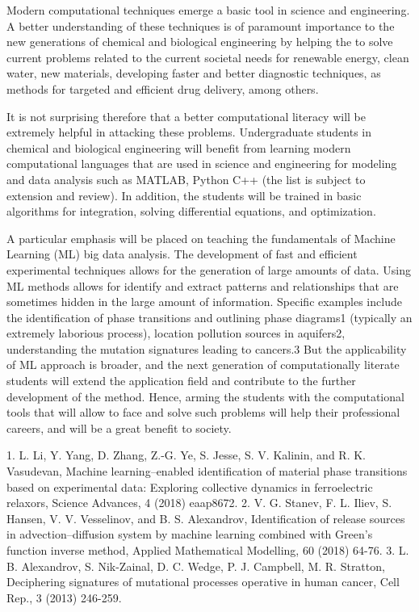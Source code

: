 Modern computational techniques emerge a basic tool in science and engineering. A better understanding of these techniques is of paramount importance to the new generations of chemical and biological engineering by helping the to solve current problems related to the current societal needs for renewable energy, clean water, new materials, developing faster and better diagnostic techniques, as methods for targeted and efficient drug delivery, among others. 

It is not surprising therefore that a better computational literacy will be extremely helpful in attacking these problems. Undergraduate students in chemical and biological engineering will benefit from learning modern computational languages that are used in science and engineering for modeling and data analysis such as MATLAB, Python C++ (the list is subject to extension and review). In addition, the students will be trained in basic algorithms for integration, solving differential equations, and optimization. 

A particular emphasis will be placed on teaching the fundamentals of Machine Learning (ML) big data analysis. The development of fast and efficient experimental techniques allows for the generation of large amounts of data. Using ML methods allows for identify and extract patterns and relationships that are sometimes hidden in the large amount of information. Specific examples include the identification of phase transitions and outlining phase diagrams1 (typically an extremely laborious process), location pollution sources in aquifers2, understanding the mutation signatures leading to cancers.3 But the applicability of ML approach is broader, and the next generation of computationally literate students will extend the application field and contribute to the further development of the method. Hence, arming the students with the computational tools that will allow to face and solve such problems will help their professional careers, and will be a great benefit to society. 

1.	L. Li, Y. Yang, D. Zhang, Z.-G. Ye, S. Jesse, S. V. Kalinin, and R. K. Vasudevan, Machine learning–enabled identification of material phase transitions based on experimental data: Exploring collective dynamics in ferroelectric relaxors, Science Advances, 4 (2018) eaap8672.
2.	V. G. Stanev, F. L. Iliev, S. Hansen, V. V. Vesselinov, and B. S. Alexandrov, Identification of release sources in advection–diffusion system by machine learning combined with Green’s function inverse method, Applied Mathematical Modelling, 60 (2018) 64-76.  
3.	L. B. Alexandrov, S. Nik-Zainal, D. C. Wedge, P. J. Campbell, M. R. Stratton, Deciphering signatures of mutational processes operative in human cancer, Cell Rep., 3 (2013) 246-259.

